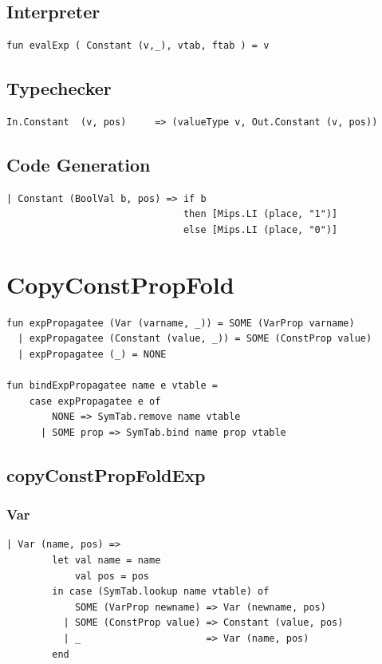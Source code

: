\documentclass[11pt]{article}
\begin{document}
    \subsection{Interpreter}
    \begin{lstlisting}[basicstyle=\small]
fun evalExp ( Constant (v,_), vtab, ftab ) = v
    \end{lstlisting}

    \subsection{Typechecker}
    \begin{lstlisting}[basicstyle=\small]
In.Constant  (v, pos)     => (valueType v, Out.Constant (v, pos))
    \end{lstlisting}

    \subsection{Code Generation}
    \begin{lstlisting}[basicstyle=\small]
| Constant (BoolVal b, pos) => if b
                               then [Mips.LI (place, "1")]
                               else [Mips.LI (place, "0")]
    \end{lstlisting}

	\newpage
	\section{CopyConstPropFold} \label{CopyConstPropFold}
	\begin{lstlisting}[basicstyle=\small]
fun expPropagatee (Var (varname, _)) = SOME (VarProp varname)
  | expPropagatee (Constant (value, _)) = SOME (ConstProp value)
  | expPropagatee (_) = NONE

fun bindExpPropagatee name e vtable =
    case expPropagatee e of
        NONE => SymTab.remove name vtable
      | SOME prop => SymTab.bind name prop vtable
	\end{lstlisting}
	\subsection{copyConstPropFoldExp} \label{copyConstPropFoldExp}
	\subsubsection{Var} \label{ccpfvar}
	\begin{lstlisting}[basicstyle=\small]
      | Var (name, pos) =>
        let val name = name
            val pos = pos
        in case (SymTab.lookup name vtable) of
            SOME (VarProp newname) => Var (newname, pos)
          | SOME (ConstProp value) => Constant (value, pos)
          | _                      => Var (name, pos)
        end
    \end{lstlisting}
\end{document}
